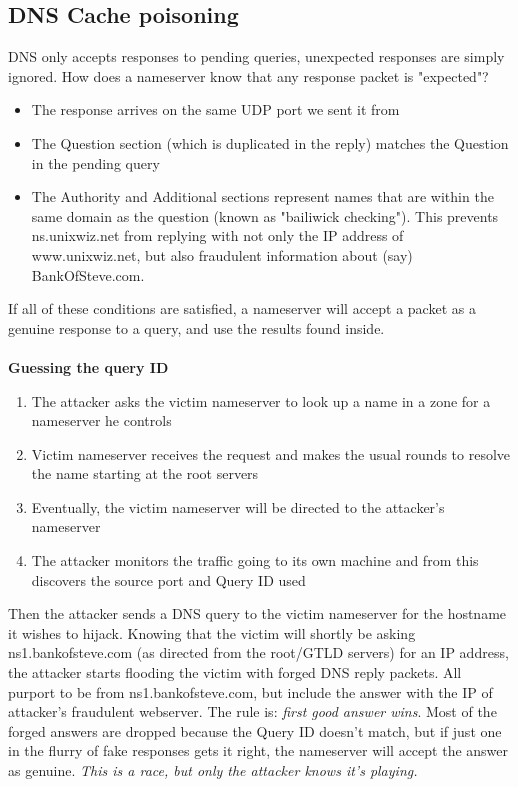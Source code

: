 \documentclass[10pt,a4paper]{book}
\begin{document}
\subsection{DNS Cache poisoning}
DNS only accepts responses to pending queries, unexpected responses are simply ignored. How does a nameserver know that any response packet is "expected"? 
\begin{itemize}
\item The response arrives on the same UDP port we sent it from
\item The Question section (which is duplicated in the reply) matches the Question in the pending query
\item The Authority and Additional sections represent names that are within the same domain as the question (known as "bailiwick checking"). This prevents ns.unixwiz.net from replying with not only the IP address of www.unixwiz.net, but also fraudulent information about (say) BankOfSteve.com. 
\end{itemize}
If all of these conditions are satisfied, a nameserver will accept a packet as a genuine response to a query, and use the results found inside.\\\\
\textbf{Guessing the query ID}
\begin{enumerate}
\item The attacker asks the victim nameserver to look up a name in a zone for a nameserver he controls
\item Victim nameserver receives the request and makes the usual rounds to resolve the name starting at the root servers
\item Eventually, the victim nameserver will be directed to the attacker's nameserver
\item The attacker monitors the traffic going to its own machine and from this discovers the source port and Query ID used
\end{enumerate}
Then the attacker sends a DNS query to the victim nameserver for the hostname it wishes to hijack. Knowing that the victim will shortly be asking ns1.bankofsteve.com (as directed from the root/GTLD servers) for an IP address, the attacker starts flooding the victim with forged DNS reply packets. All purport to be from ns1.bankofsteve.com, but include the answer with the IP of attacker's fraudulent webserver. The rule is: {\it first good answer wins}. Most of the forged answers are dropped because the Query ID doesn't match, but if just one in the flurry of fake responses gets it right, the nameserver will accept the answer as genuine. {\it This is a race, but only the attacker knows it's playing.}\\
\end{document}
